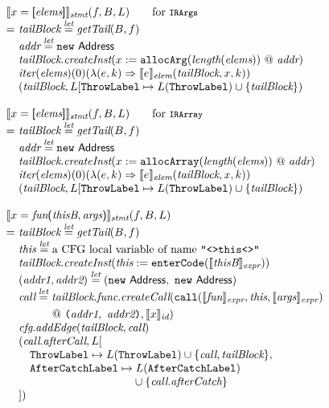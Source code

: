 \[
\begin{array}{l@{}l@{~}l}
\lefteqn{\transfun{\irarray{x}{\emph{elems}}}_{\emph{stmt}}(f, B, L)\qquad \mbox{for \mtt{IRArgs}}}\\
& = & \emph{tailBlock} \letval \getTail(B, f)\\
& & \emph{addr} \letval \new\ \Address\\
& & \emph{tailBlock}.\emph{createInst}(x := \TT{allocArg}(\length(\emph{elems})) ~@~ \emph{addr})\\
& & \iter(\emph{elems})(0)(\lambda(e,k) \Rightarrow \transfun{e}_{\emph{elem}}(\emph{tailBlock}, x, k))\\
& & (\emph{tailBlock}, L[\ThrowLabel \mapsto L(\ThrowLabel) \cup \{ \emph{tailBlock} \})\\
& & \\

\lefteqn{\transfun{\irarray{x}{\emph{elems}}}_{\emph{stmt}}(f, B, L)\qquad \mbox{for \mtt{IRArray}}}\\
& = & \emph{tailBlock} \letval \getTail(B, f)\\
& & \emph{addr} \letval \new\ \Address\\
& & \emph{tailBlock}.\emph{createInst}(x :=\TT{allocArray}(\length(\emph{elems})) ~@~ \emph{addr})\\
& & \iter(\emph{elems})(0)(\lambda(e,k) \Rightarrow \transfun{e}_{\emph{elem}}(\emph{tailBlock}, x, k))\\
& & (\emph{tailBlock}, L[\ThrowLabel \mapsto L(\ThrowLabel) \cup \{ \emph{tailBlock} \})\\
& & \\


\lefteqn{\transfun{\ircfgcall{x}{\emph{fun}}{\emph{thisB}, \emph{args}}}_{\emph{stmt}}(f, B, L)}\\
& = & \emph{tailBlock} \letval \getTail(B, f)\\
& & \emph{this} \letval \mbox{a CFG local variable of name \TT{"<>this<>"}}\\
& & \emph{tailBlock}.\emph{createInst}(\emph{this} := \TT{enterCode}(\transfun{\emph{thisB}}_{\emph{expr}}))\\
& & (\emph{addr1}, \emph{addr2}) \letval (\new\ \Address,\ \new\ \Address)\\
& & \emph{call} \letval \emph{tailBlock}.\emph{func}.\emph{createCall}(\TT{call}(\transfun{\emph{fun}}_{\emph{expr}}, \emph{this}, \transfun{\emph{args}}_{\emph{expr}})\\
&& \phantom{\emph{call} \letval }
 ~@~ \TT{(}\emph{addr1},\ \emph{addr2}\TT{)}, \transfun{x}_{\emph{id}})\\
& & \emph{cfg}.\emph{addEdge}(\emph{tailBlock}, \emph{call})\\
& & (\emph{call}.\emph{afterCall}, L[\\
& & \quad \ThrowLabel \mapsto L(\ThrowLabel) \cup \{ \emph{call}, \emph{tailBlock} \},\\
& & \quad \AfterCatchLabel \mapsto L(\AfterCatchLabel)\\
& & \quad \phantom{\AfterCatchLabel \mapsto} \cup \{ \emph{call}.\emph{afterCatch} \}\\
& & ])\\


\end{array}\]
